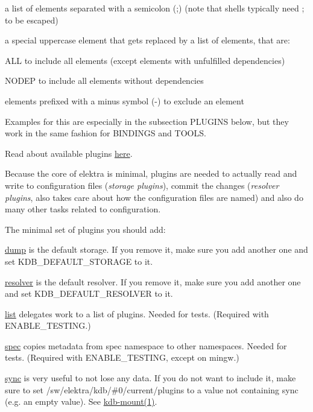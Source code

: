 \begin{DoxyItemize}
\item a list of elements separated with a semicolon ({\ttfamily ;}) (note that shells typically need {\ttfamily ;} to be escaped)
\item a special uppercase element that gets replaced by a list of elements, that are\+:
\begin{DoxyItemize}
\item {\ttfamily A\+LL} to include all elements (except elements with unfulfilled dependencies)
\item {\ttfamily N\+O\+D\+EP} to include all elements without dependencies
\end{DoxyItemize}
\item elements prefixed with a minus symbol ({\ttfamily -\/}) to exclude an element
\end{DoxyItemize}

Examples for this are especially in the subsection {\ttfamily P\+L\+U\+G\+I\+NS} below, but they work in the same fashion for {\ttfamily B\+I\+N\+D\+I\+N\+GS} and {\ttfamily T\+O\+O\+LS}.

Read about available plugins \hyperlink{src_plugins_README_md}{here}.

Because the core of elektra is minimal, plugins are needed to actually read and write to configuration files ({\itshape storage plugins}), commit the changes ({\itshape resolver plugins}, also takes care about how the configuration files are named) and also do many other tasks related to configuration.

The minimal set of plugins you should add\+:


\begin{DoxyItemize}
\item \hyperlink{autotoc_md191_src_plugins_dump_README_md}{dump} is the default storage. If you remove it, make sure you add another one and set {\ttfamily K\+D\+B\+\_\+\+D\+E\+F\+A\+U\+L\+T\+\_\+\+S\+T\+O\+R\+A\+GE} to it.
\item \hyperlink{autotoc_md579_src_plugins_resolver_README_md}{resolver} is the default resolver. If you remove it, make sure you add another one and set {\ttfamily K\+D\+B\+\_\+\+D\+E\+F\+A\+U\+L\+T\+\_\+\+R\+E\+S\+O\+L\+V\+ER} to it.
\item \hyperlink{autotoc_md353_src_plugins_list_README_md}{list} delegates work to a list of plugins. Needed for tests. (Required with {\ttfamily E\+N\+A\+B\+L\+E\+\_\+\+T\+E\+S\+T\+I\+NG}.)
\item \hyperlink{autotoc_md605_src_plugins_spec_README_md}{spec} copies metadata from spec namespace to other namespaces. Needed for tests. (Required with {\ttfamily E\+N\+A\+B\+L\+E\+\_\+\+T\+E\+S\+T\+I\+NG}, except on mingw.)
\item \hyperlink{autotoc_md624_src_plugins_sync_README_md}{sync} is very useful to not lose any data. If you do not want to include it, make sure to set {\ttfamily /sw/elektra/kdb/\#0/current/plugins} to a value not containing sync (e.\+g. an empty value). See \hyperlink{doc_help_kdb-mount_md}{kdb-\/mount(1)}.
\end{DoxyItemize}

